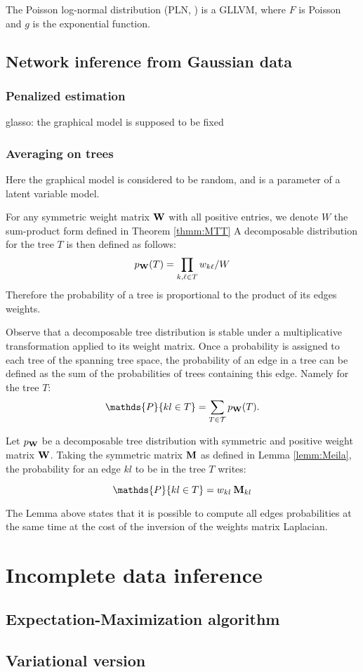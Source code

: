  The Poisson log-normal distribution (PLN, \citet{AiH89}) is a GLLVM, where $F$ is Poisson and $g$ is the exponential function. 
\subsection{Network inference from Gaussian data}
 \subsubsection{Penalized estimation}
 glasso: the graphical model is supposed to be fixed
 \subsubsection{Averaging on trees}
 Here the graphical model is considered to be random, and is a  parameter of a latent variable model.
\begin{definition}
For any symmetric weight matrix ${\bf W}$ with all positive entries, we denote $W$ the sum-product form defined in Theorem \ref{thmm:MTT} A decomposable  distribution for the tree $T$ is then defined as follows:
$$p_{{\bf W}}(T) = \prod_{k,\ell \in T} w_{k\ell} / W $$
Therefore the probability of a tree is proportional to the product of its edges weights.
\end{definition}
Observe that a decomposable tree distribution is stable under a multiplicative transformation applied to its weight matrix. Once a probability is assigned to each tree of the spanning tree space, the probability of an edge in a tree can be defined as the sum of the probabilities of trees containing this edge. Namely for the tree $T$:
$$\mathds{P}\{kl\in T\} = \sum_{T\in \mathcal{T}} p_{\Wbf}(T).$$

\begin{lemma}  \label{lem:Kirshner}
    Let $p_{{\bf W}}$ be a decomposable tree distribution with symmetric and positive weight matrix ${\bf W}$. Taking the symmetric matrix ${\bf M}$ as defined in Lemma  \ref{lemm:Meila}, the probability for an edge $kl$ to be in the tree $T$ writes:
 
$$\mathds{P}\{kl\in T\} =  w_{kl}\: \Mbf_{kl}$$
\end{lemma}
The Lemma above states that it is possible to compute all edges probabilities at the same time at the cost of the inversion of the weights matrix Laplacian.
\section{Incomplete data inference}

 \subsection{Expectation-Maximization algorithm}
 
 \subsection{Variational version}
  